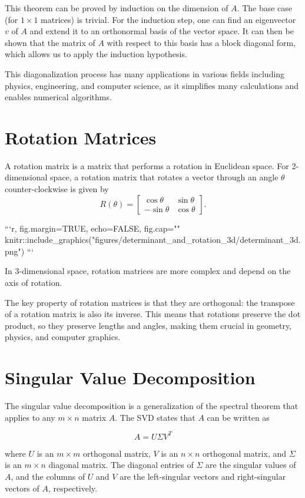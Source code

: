 \documentclass{tufte-handout}
\begin{document}
This theorem can be proved by induction on the dimension of $A$. The base case (for $1 \times 1$ matrices) is trivial. For the induction step, one can find an eigenvector $v$ of $A$ and extend it to an orthonormal basis of the vector space. It can then be shown that the matrix of $A$ with respect to this basis has a block diagonal form, which allows us to apply the induction hypothesis.

This diagonalization process has many applications in various fields including physics, engineering, and computer science, as it simplifies many calculations and enables numerical algorithms.

\section{Rotation Matrices}

A rotation matrix is a matrix that performs a rotation in Euclidean space. For 2-dimensional space, a rotation matrix that rotates a vector through an angle $\theta$ counter-clockwise is given by
$$ R(\theta) = \begin{bmatrix} \cos \theta & \sin \theta \\ -\sin \theta & \cos \theta \end{bmatrix}.$$

```{r, fig.margin=TRUE, echo=FALSE, fig.cap=""}
knitr::include_graphics("figures/determinant_and_rotation_3d/determinant_3d.png")
```

In 3-dimensional space, rotation matrices are more complex and depend on the axis of rotation.

The key property of rotation matrices is that they are orthogonal: the transpose of a rotation matrix is also its inverse. This means that rotations preserve the dot product, so they preserve lengths and angles, making them crucial in geometry, physics, and computer graphics.



\section{Singular Value Decomposition}

The singular value decomposition is a generalization of the spectral theorem that applies to any $m \times n$ matrix $A$. The SVD states that $A$ can be written as

$$A = U \Sigma V^T$$

where $U$ is an $m \times m$ orthogonal matrix, $V$ is an $n \times n$ orthogonal matrix, and $\Sigma$ is an $m \times n$ diagonal matrix. The diagonal entries of $\Sigma$ are the singular values of $A$, and the columns of $U$ and $V$ are the left-singular vectors and right-singular vectors of $A$, respectively.
\end{document}
